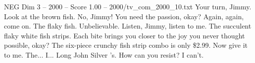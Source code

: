 \begin{textsample}{NEG Dim 3 – 2000 – Score 1.00 – 2000/tv\_com\_2000\_10.txt}  \label{ex:f3_neg_015}
Your turn, Jimmy.
Look at the brown fish.
No, Jimmy!
You need the passion, okay?
Again, again, come on.
The flaky fish.
Unbelievable.
Listen, Jimmy, listen to me.
The succulent flaky white fish strips.
Each bite brings you closer to the joy you never thought possible, okay?
The six-piece crunchy fish strip combo is only \$2.99.
Now give it to me.
The...
I...
Long John Silver 's.
How can you resist?
I can't.

\end{textsample}
